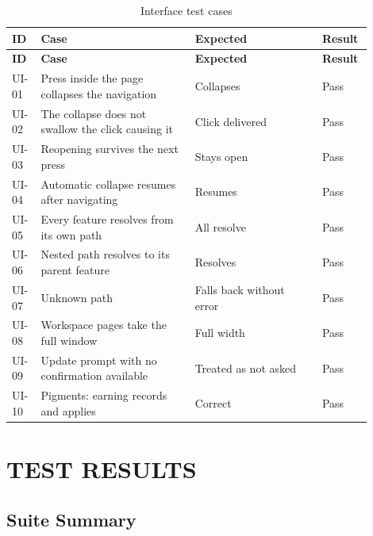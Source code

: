 \documentclass[12pt,a4paper]{report}
\begin{document}
\begin{longtable}{@{}p{0.07\linewidth}p{0.40\linewidth}p{0.33\linewidth}p{0.10\linewidth}@{}}
\caption{Interface test cases}\label{tab:ui}\\
\toprule
\textbf{ID} & \textbf{Case} & \textbf{Expected} & \textbf{Result} \\
\midrule
\endfirsthead
\toprule
\textbf{ID} & \textbf{Case} & \textbf{Expected} & \textbf{Result} \\
\midrule
\endhead

UI-01 & Press inside the page collapses the navigation & Collapses & Pass \\
UI-02 & The collapse does not swallow the click causing it & Click delivered
  & Pass \\
UI-03 & Reopening survives the next press & Stays open & Pass \\
UI-04 & Automatic collapse resumes after navigating & Resumes & Pass \\
UI-05 & Every feature resolves from its own path & All resolve & Pass \\
UI-06 & Nested path resolves to its parent feature & Resolves & Pass \\
UI-07 & Unknown path & Falls back without error & Pass \\
UI-08 & Workspace pages take the full window & Full width & Pass \\
UI-09 & Update prompt with no confirmation available & Treated as not asked
  & Pass \\
UI-10 & Pigments: earning records and applies & Correct & Pass \\
\bottomrule
\end{longtable}

\chapter{TEST RESULTS}

\section{Suite Summary}
\end{document}
